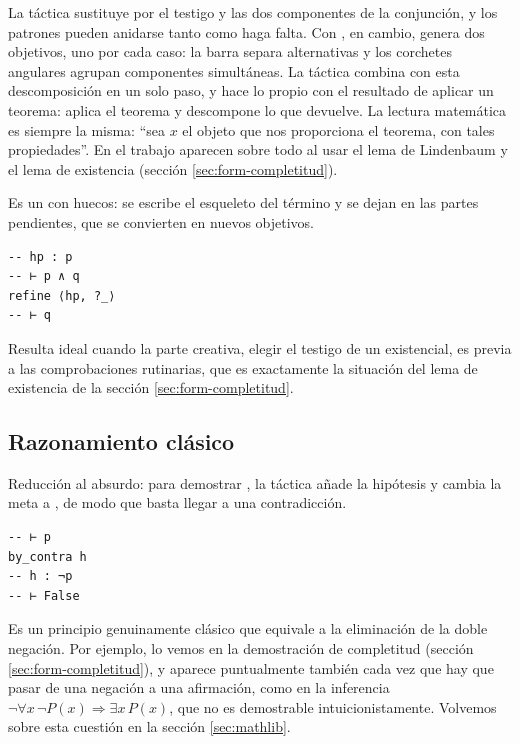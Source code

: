 La táctica sustituye  por el testigo  y las dos componentes de la conjunción, y los patrones pueden anidarse tanto como haga falta. Con , en cambio,  genera dos objetivos, uno por cada caso: la barra separa alternativas y los corchetes angulares agrupan componentes simultáneas. La táctica  combina  con esta descomposición en un solo paso, y  hace lo propio con el resultado de aplicar un teorema:  aplica el teorema y descompone lo que devuelve. La lectura matemática es siempre la misma: ``sea $x$ el objeto que nos proporciona el teorema, con tales propiedades''. En el trabajo aparecen sobre todo al usar el lema de Lindenbaum y el lema de existencia (sección \ref{sec:form-completitud}).

 Es un  con huecos: se escribe el esqueleto del término y se dejan  en las partes pendientes, que se convierten en nuevos objetivos.

\begin{lstlisting}
-- hp : p
-- ⊢ p ∧ q
refine ⟨hp, ?_⟩
-- ⊢ q
\end{lstlisting}

Resulta ideal cuando la parte creativa, elegir el testigo de un existencial, es previa a las comprobaciones rutinarias, que es exactamente la situación del lema de existencia de la sección \ref{sec:form-completitud}.

\subsection{Razonamiento clásico}

 Reducción al absurdo: para demostrar , la táctica  añade la hipótesis  y cambia la meta a , de modo que basta llegar a una contradicción.

\begin{lstlisting}
-- ⊢ p
by_contra h
-- h : ¬p
-- ⊢ False
\end{lstlisting}

Es un principio genuinamente clásico que equivale a la eliminación de la doble negación. Por ejemplo, lo vemos en la demostración de completitud (sección \ref{sec:form-completitud}), y aparece puntualmente también cada vez que hay que pasar de una negación a una afirmación, como en la inferencia $\lnot\forall x\, \lnot P(x) \Rightarrow \exists x\, P(x)$, que no es demostrable intuicionistamente. Volvemos sobre esta cuestión en la sección \ref{sec:mathlib}.

